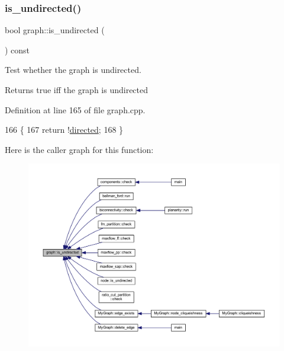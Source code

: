 \subsubsection{\texorpdfstring{is\+\_\+undirected()}{is\_undirected()}}
{\footnotesize\ttfamily bool graph\+::is\+\_\+undirected (\begin{DoxyParamCaption}{ }\end{DoxyParamCaption}) const\hspace{0.3cm}{\ttfamily [inherited]}}

Test whether the graph is undirected.

\begin{DoxyReturn}{Returns}
true iff the graph is undirected 
\end{DoxyReturn}


Definition at line 165 of file graph.\+cpp.


\begin{DoxyCode}
166 \{
167     \textcolor{keywordflow}{return} !\mbox{\hyperlink{classgraph_ab4120df210eb3d03d20b0bd27f8cbe8c}{directed}};
168 \}
\end{DoxyCode}
Here is the caller graph for this function\+:
\nopagebreak
\begin{figure}[H]
\begin{center}
\leavevmode
\includegraphics[width=350pt]{classgraph_aba427ff8ba0f70c68416ec1351344cd8_icgraph}
\end{center}
\end{figure}
\mbox{\label{classgraph_ac28cb3468623a480709d3329033d4ec8}} 
